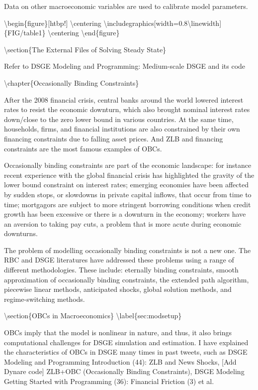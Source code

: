 \documentclass[10pt,math=newtx,citestyle=gb7714-2015,bibstyle=gb7714-2015]{elegantbook}
\begin{document}
	Data on other macroeconomic variables are used to calibrate model parameters.
	
	
	\textbackslash{}begin\{figure\}[htbp!]
	\textbackslash{}centering
	\textbackslash{}includegraphics[width=0.8\textbackslash{}linewidth]\{FIG/table1\}
	\textbackslash{}centering
	\textbackslash{}end\{figure\}
	
	
	\textbackslash{}section\{The External Files of Solving Steady State\}
	
	Refer to DSGE Modeling and Programming: Medium-scale DSGE and its code
	
	
	\textbackslash{}chapter\{Occasionally Binding Constraints\}
	
	After the 2008 financial crisis, central banks around the world lowered interest rates to resist the economic downturn, which also brought nominal interest rates down/close to the zero lower bound in various countries. At the same time, households, firms, and financial institutions are also constrained by their own financing constraints due to falling asset prices. And ZLB and financing constraints are the most famous examples of OBCs.
	
	Occasionally binding constraints are part of the economic landscape: for instance recent experience with the global financial crisis has highlighted the gravity of the lower bound constraint on interest rates; emerging economies have been affected by sudden stops, or slowdowns in private capital inflows, that occur from time to time; mortgagors are subject
	to more stringent borrowing conditions when credit growth has been excessive or there is a downturn in the economy; workers have an aversion to taking pay cuts, a problem that is more acute during economic downturns.
	
	The problem of modelling occasionally binding constraints is not a new one. The RBC and DSGE literatures have addressed these problems using a range of different methodologies. These include: eternally binding constraints, smooth approximation of occasionally binding constraints, the extended path algorithm, piecewise linear methods, anticipated shocks, global solution methods, and regime-switching methods.
	
	\textbackslash{}section\{OBCs in Macroeconomics\} \textbackslash{}label\{sec:modsetup\}
	
	OBCs imply that the model is nonlinear in nature, and thus, it also brings computational challenges for DSGE simulation and estimation. I have explained the characteristics of OBCs in DSGE many times in past tweets, such as DSGE Modeling and Programming Introduction (44): ZLB and News Shocks, [Add Dynare code] ZLB+OBC (Occasionally Binding Constraints), DSGE Modeling Getting Started with Programming (36): Financial Friction (3) et al.
	
\end{document}
